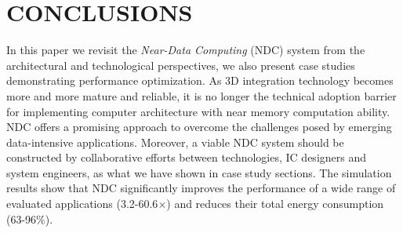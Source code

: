 \documentclass[letterpaper, 11pt, conference, margin=1in]{ieeeconf}   %
\begin{document}
\section{CONCLUSIONS}
In this paper we revisit the \textit{Near-Data Computing} (NDC) system from the architectural and technological perspectives,  we also present case studies demonstrating performance optimization. As 3D integration technology becomes more and more mature and reliable, it is no longer the technical adoption barrier for implementing computer architecture with near memory computation ability. NDC offers a promising approach to overcome the challenges posed by emerging data-intensive applications. Moreover, a viable NDC system should be constructed by collaborative efforts between technologies, IC designers and system engineers, as what we have shown in case study sections. The simulation results show that NDC significantly improves the performance of a wide range of evaluated applications (3.2-60.6$\times$) and reduces their total energy consumption (63-96$\%$).


















\end{document}
